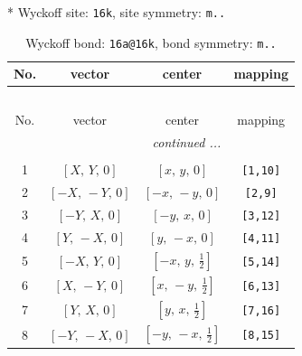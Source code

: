\documentclass[fleqn,8pt]{jsarticle}
\begin{document}
* Wyckoff site: {\tt 16k}, site symmetry: {\tt m..}
\renewcommand{\arraystretch}{1.2}
\begin{longtable}{cccc}
\caption{Wyckoff bond: {\tt 16a@16k}, bond symmetry: {\tt m..}}
 \\
 \hline \hline
No. & vector & center & mapping \\ \hline \endfirsthead

\multicolumn{3}{l}{\tablename\ \thetable{}} \\
 \hline \hline
No. & vector & center & mapping \\ \hline \endhead

 \hline \hline
\multicolumn{3}{r}{\footnotesize\it continued ...} \\ \endfoot

 \hline \hline
\multicolumn{3}{r}{} \\ \endlastfoot

1 & $\left[ X,\, Y,\, 0 \right]$ & $\left[ x,\, y,\, 0 \right]$ & {\tt [1,10]} \\ \hline
2 & $\left[ - X,\, - Y,\, 0 \right]$ & $\left[ - x,\, - y,\, 0 \right]$ & {\tt [2,9]} \\ \hline
3 & $\left[ - Y,\, X,\, 0 \right]$ & $\left[ - y,\, x,\, 0 \right]$ & {\tt [3,12]} \\ \hline
4 & $\left[ Y,\, - X,\, 0 \right]$ & $\left[ y,\, - x,\, 0 \right]$ & {\tt [4,11]} \\ \hline
5 & $\left[ - X,\, Y,\, 0 \right]$ & $\left[ - x,\, y,\, \frac{1}{2} \right]$ & {\tt [5,14]} \\ \hline
6 & $\left[ X,\, - Y,\, 0 \right]$ & $\left[ x,\, - y,\, \frac{1}{2} \right]$ & {\tt [6,13]} \\ \hline
7 & $\left[ Y,\, X,\, 0 \right]$ & $\left[ y,\, x,\, \frac{1}{2} \right]$ & {\tt [7,16]} \\ \hline
8 & $\left[ - Y,\, - X,\, 0 \right]$ & $\left[ - y,\, - x,\, \frac{1}{2} \right]$ & {\tt [8,15]} \\
\end{longtable}
\renewcommand{\arraystretch}{1.2}
\end{document}
